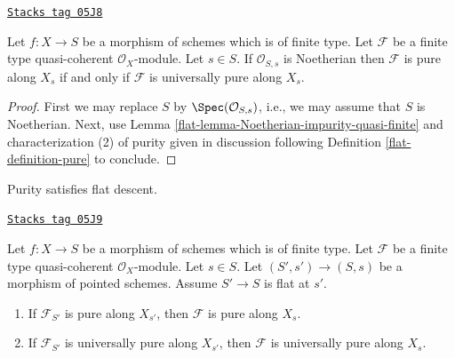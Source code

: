 \begin{lemma}
\label{flat-lemma-Noetherian-base-change}
\href{https://stacks.math.columbia.edu/tag/05J8}{\texttt{Stacks tag 05J8}}

Let $f : X \to S$ be a morphism of schemes which is of finite type.
Let $\mathcal{F}$ be a finite type quasi-coherent $\mathcal{O}_X$-module.
Let $s \in S$. If $\mathcal{O}_{S, s}$ is Noetherian then
$\mathcal{F}$ is pure along $X_s$ if and only if $\mathcal{F}$
is universally pure along $X_s$.
\end{lemma}

\begin{proof}

First we may replace $S$ by $\Spec(\mathcal{O}_{S, s})$, i.e.,
we may assume that $S$ is Noetherian. Next, use
Lemma \ref{flat-lemma-Noetherian-impurity-quasi-finite}
and characterization (2) of purity given in discussion following
Definition \ref{flat-definition-pure}
to conclude.
\end{proof}

Purity satisfies flat descent.

\begin{lemma}
\label{flat-lemma-flat-descend-pure}
\href{https://stacks.math.columbia.edu/tag/05J9}{\texttt{Stacks tag 05J9}}

Let $f : X \to S$ be a morphism of schemes which is of finite type.
Let $\mathcal{F}$ be a finite type quasi-coherent $\mathcal{O}_X$-module.
Let $s \in S$. Let $(S', s') \to (S, s)$ be a morphism of pointed schemes.
Assume $S' \to S$ is flat at $s'$.
\begin{enumerate}
\item If $\mathcal{F}_{S'}$ is pure along $X_{s'}$,
then $\mathcal{F}$ is pure along $X_s$.
\item If $\mathcal{F}_{S'}$ is universally pure along $X_{s'}$,
then $\mathcal{F}$ is universally pure along $X_s$.
\end{enumerate}
\end{lemma}

